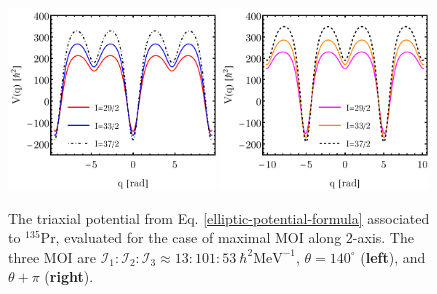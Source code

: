 \begin{figure}
    \centering
    \includegraphics[width=0.49\textwidth]{Chapters/Figures/potential-fit2-theta.pdf}
    \includegraphics[width=0.49\textwidth]{Chapters/Figures/potential-fit2-theta-pi.pdf}
    \caption{The triaxial potential from Eq. \ref{elliptic-potential-formula} associated to $^{135}$Pr, evaluated for the case of maximal MOI along $2$-axis. The three MOI are $\mathcal{I}_1:\mathcal{I}_2:\mathcal{I}_3\approx13:101:53\ \hbar^2\text{MeV}^{-1}$, $\theta=140^\circ$ (\textbf{left}), and $\theta+\pi$ (\textbf{right}).}
    \label{elliptic-potential-theta2}
\end{figure}
